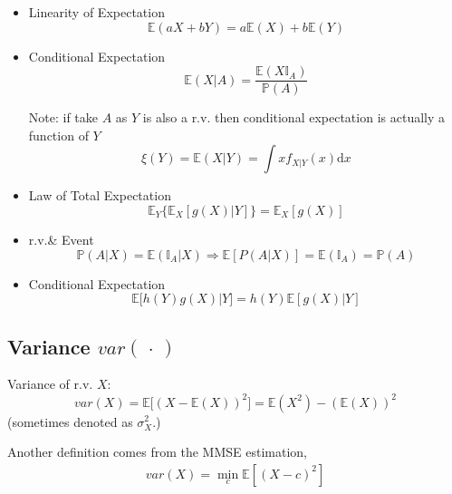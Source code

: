\begin{itemize}
    \item Linearity of Expectation\begin{equation}
        \mathbb{E}(aX+bY)=a \mathbb{E}(X)+b\mathbb{E}(Y)
    \end{equation}
    \item Conditional Expectation\begin{equation}
        \mathbb{E}(X|A)=\frac{\mathbb{E}(X\mathbb{I}_A)}{\mathbb{P}(A)}
    \end{equation}
    
    Note: if take $A$ as $Y$ is also a r.v. then conditional expectation is actually a function of $Y$
    \begin{equation}\xi (Y)=\mathbb{E}(X|Y)=\int xf_{X|Y}(x)\mathrm{d}x\end{equation}

    

    \item Law of Total Expectation\begin{equation}
        \mathbb{E}_Y\big\{\mathbb{E}_X[g(X)|Y]\big\}=\mathbb{E}_X[g(X)]
    \end{equation}
    \item r.v.\& Event
    \begin{equation}
        \mathbb{P}(A|X)=\mathbb{E}(\mathbb{I}_A|X)\Rightarrow \mathbb{E}[P(A|X)]=\mathbb{E}(\mathbb{I}_A)=\mathbb{P}(A)
    \end{equation}
    \item Conditional Expectation
    \begin{equation}
        \mathbb{E}\big[h(Y)g(X)|Y\big]=h(Y)\mathbb{E}[g(X)|Y]
    \end{equation}
\end{itemize}


\subsection{Variance $ var(\, \cdot \, ) $}
    Variance of r.v. $X$: 
    \begin{equation}
        var(X)=\mathbb{E}\big[(X-\mathbb{E}(X))^2\big]=\mathbb{E}(X^2)-(\mathbb{E}(X))^2
    \end{equation}
    (sometimes denoted as $\sigma^2_X$.)

    Another definition comes from the MMSE estimation, 
    \begin{align}
        var(X)=\mathop{\min}\limits_{c}\mathbb{E}\left[ (X-c)^2 \right]   
    \end{align}
    
